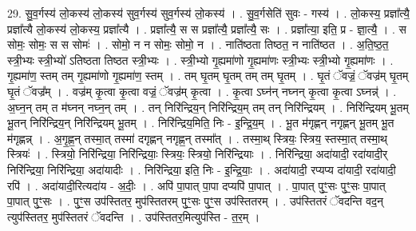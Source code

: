 \documentclass[17pt]{extarticle}
\begin{document}
29. सु॒व॒र्गस्य॑ लो॒कस्य॑ लो॒कस्य॑ सुव॒र्गस्य॑ सुव॒र्गस्य॑ लो॒कस्य॑ । . सु॒व॒र्गसेति॑ सुवः - गस्य॑ । . लो॒कस्य॒ प्रज्ञा᳚त्यै॒ प्रज्ञा᳚त्यै लो॒कस्य॑ लो॒कस्य॒ प्रज्ञा᳚त्यै । . प्रज्ञा᳚त्यै॒ स स प्रज्ञा᳚त्यै॒ प्रज्ञा᳚त्यै॒ सः । . प्रज्ञा᳚त्या॒ इति॒ प्र - ज्ञा॒त्यै॒ । . स सोमः॒ सोमः॒ स स सोमः॑ । . सोमो॒ न न सोमः॒ सोमो॒ न । . नाति॑ष्ठता तिष्ठत॒ न नाति॑ष्ठत । . अ॒ति॒ष्ठ॒त॒ स्त्री॒भ्यः स्त्री॒भ्यो॑ ऽतिष्ठता तिष्ठत स्त्री॒भ्यः । . स्त्री॒भ्यो गृ॒ह्यमा॑णो गृ॒ह्यमा॑णः स्त्री॒भ्यः स्त्री॒भ्यो गृ॒ह्यमा॑णः । . गृ॒ह्यमा॑ण॒ स्तम् तम् गृ॒ह्यमा॑णो गृ॒ह्यमा॑ण॒ स्तम् । . तम् घृ॒तम् घृ॒तम् तम् तम् घृ॒तम् । . घृ॒तं ॅवज्रं॒ ॅवज्र॑म् घृ॒तम् घृ॒तं ॅवज्र᳚म् । . वज्र॑म् कृ॒त्वा कृ॒त्वा वज्रं॒ ॅवज्र॑म् कृ॒त्वा । . कृ॒त्वा ऽघ्न॑न् नघ्नन् कृ॒त्वा कृ॒त्वा ऽघ्नन्न्॑ । . अ॒घ्न॒न् तम् त म॑घ्नन् नघ्न॒न् तम् । . तन् निरि॑न्द्रिय॒न् निरि॑न्द्रिय॒म् तम् तन् निरि॑न्द्रियम् । . निरि॑न्द्रियम् भू॒तम् भू॒तन् निरि॑न्द्रिय॒न् निरि॑न्द्रियम् भू॒तम् । . निरि॑न्द्रिय॒मिति॒ निः - इ॒न्द्रि॒य॒म् । . भू॒त म॑गृह्णन् नगृह्णन् भू॒तम् भू॒त म॑गृह्णन्न् । . अ॒गृ॒ह्ण॒न् तस्मा॒त् तस्मा॑ दगृह्णन् नगृह्ण॒न् तस्मा᳚त् । . तस्मा॒थ् स्त्रियः॒ स्त्रिय॒ स्तस्मा॒त् तस्मा॒थ् स्त्रियः॑ । . स्त्रियो॒ निरि॑न्द्रिया॒ निरि॑न्द्रियाः॒ स्त्रियः॒ स्त्रियो॒ निरि॑न्द्रियाः । . निरि॑न्द्रिया॒ अदा॑यादी॒ रदा॑यादी॒र् निरि॑न्द्रिया॒ निरि॑न्द्रिया॒ अदा॑यादीः । . निरि॑न्द्रिया॒ इति॒ निः - इ॒न्द्रि॒याः॒ । . अदा॑यादी॒ रप्यप्य दा॑यादी॒ रदा॑यादी॒ रपि॑ । . अदा॑यादी॒रित्यदा॑य - अ॒दीः॒ । . अपि॑ पा॒पात् पा॒पा दप्यपि॑ पा॒पात् । . पा॒पात् पुꣳ॒॒सः पुꣳ॒॒सः पा॒पात् पा॒पात् पुꣳ॒॒सः । . पुꣳ॒॒स उप॑स्तितर॒ मुप॑स्तितरम् पुꣳ॒॒सः पुꣳ॒॒स उप॑स्तितरम् । . उप॑स्तितरं ॅवदन्ति वद॒न् त्युप॑स्तितर॒ मुप॑स्तितरं ॅवदन्ति । . उप॑स्तितर॒मित्युप॑स्ति - त॒र॒म् । \newline
\end{document}
